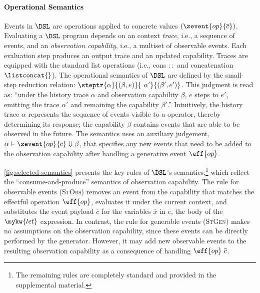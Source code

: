 \paragraph{Operational Semantics} Events in $\DSL$ are operations
applied to concrete values $(\zevent{op}{\overline{c}})$. Evaluating a
$\DSL$ program depends on an context \emph{trace}, i.e., a sequence of
events, and an \emph{observation capability}, i.e., a multiset of
observable events. Each evaluation step produces an output trace and an updated
capability. Traces are equipped with the standard list operations (i.e.,
cons ${::}$ and concatenation $\listconcat{}$).  The operational
semantics of $\DSL$ are defined by the small-step reduction relation:
$\steptr{\alpha}{(\beta, e)}{~\alpha'}{(\beta', e')}$.  This judgment
is read as: ``under the history trace $\alpha$ and observation capability
$\beta$, $e$ steps to $e'$, emitting the trace $\alpha'$ and remaining
the capability $\beta'$.'' Intuitively, the history trace $\alpha$
represents the sequence of events visible to a operator, thereby
determining its response; the capability $\beta$ contains events that
are able to be observed in the future. The semantics uses an auxiliary judgement,
$\alpha \vDash \zevent{op}{\overline{c}} \Downarrow \beta$, that
specifies any new events that need to be added to the observation capability
after handling a generative event $\eff{op}$.

\autoref{fig:selected-semantics} presents the key rules of $\DSL$'s
semantics,\footnote{The remaining rules are completely standard and
  provided in the supplemental material.} which reflect the ``consume-and-produce'' semantics of
observation capability.
The rule for observable
events (\textsc{StObs}) removes
an event from the capability that matches the effectful operation $\eff{op}$,
evaluates it under the current context, and substitutes the event
payload $\overline{c}$ for the variables $\overline{x}$ in $e$, the
body of the $\mykw{let}$ expression. In contrast, the rule for generable events (\textsc{StGen}) makes no assumptions on the observation capability, since these events can be directly
performed by the generator. However, it may add new observable events to the
resulting observation capability as a consequence of handling $\eff{op}\ \overline{c}$.



